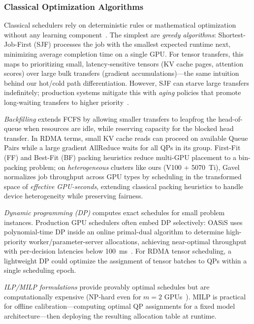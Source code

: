 \documentclass[11pt,letterpaper]{article}
\theoremstyle{definition}
\begin{document}
\subsubsection{Classical Optimization Algorithms}

Classical schedulers rely on deterministic rules or mathematical optimization without any learning component~\cite{gpu-scheduling-survey}. The simplest are \emph{greedy algorithms}: Shortest-Job-First (SJF) processes the job with the smallest expected runtime next, minimizing average completion time on a single GPU. For tensor transfers, this maps to prioritizing small, latency-sensitive tensors (KV cache pages, attention scores) over large bulk transfers (gradient accumulations)---the same intuition behind our hot/cold path differentiation. However, SJF can starve large transfers indefinitely; production systems mitigate this with \emph{aging} policies that promote long-waiting transfers to higher priority~\cite{tiresias2019}.

\emph{Backfilling} extends FCFS by allowing smaller transfers to leapfrog the head-of-queue when resources are idle, while reserving capacity for the blocked head transfer. In RDMA terms, small KV cache reads can proceed on available Queue Pairs while a large gradient AllReduce waits for all QPs in its group. First-Fit (FF) and Best-Fit (BF) packing heuristics reduce multi-GPU placement to a bin-packing problem; on \emph{heterogeneous} clusters like ours (V100 + 5070~Ti), Gavel~\cite{gavel2020} normalizes job throughput across GPU types by scheduling in the transformed space of \emph{effective GPU-seconds}, extending classical packing heuristics to handle device heterogeneity while preserving fairness.

\emph{Dynamic programming (DP)} computes exact schedules for small problem instances. Production GPU schedulers often embed DP selectively: OASiS uses polynomial-time DP inside an online primal-dual algorithm to determine high-priority worker/parameter-server allocations, achieving near-optimal throughput with per-decision latencies below 100~ms~\cite{gpu-scheduling-survey}. For RDMA tensor scheduling, a lightweight DP could optimize the assignment of tensor batches to QPs within a single scheduling epoch.

\emph{ILP/MILP formulations} provide provably optimal schedules but are computationally expensive (NP-hard even for $m=2$ GPUs~\cite{gpu-scheduling-survey}). MILP is practical for offline calibration---computing optimal QP assignments for a fixed model architecture---then deploying the resulting allocation table at runtime.
\end{document}
